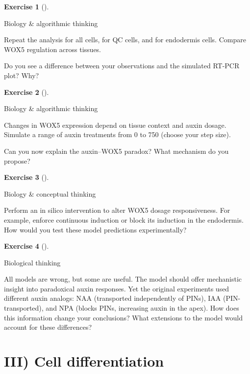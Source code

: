 \documentclass[
  letterpaper,
  DIV=11,
  numbers=noendperiod]{scrreprt}
\theoremstyle{definition}
\newtheorem{exercise}{Exercise}[chapter]
\theoremstyle{remark}
\begin{document}
\begin{exercise}[]\protect\hypertarget{exr-tur}{}\label{exr-tur}

Biology \& algorithmic thinking

Repeat the analysis for all cells, for QC cells, and for endodermis
cells. Compare WOX5 regulation across tissues.

Do you see a difference between your observations and the simulated
RT-PCR plot? Why?

\end{exercise}

\begin{exercise}[]\protect\hypertarget{exr-tur}{}\label{exr-tur}

Biology \& algorithmic thinking

Changes in WOX5 expression depend on tissue context and auxin dosage.
Simulate a range of auxin treatments from 0 to 750 (choose your step
size).

Can you now explain the auxin--WOX5 paradox? What mechanism do you
propose?

\end{exercise}

\begin{exercise}[]\protect\hypertarget{exr-tur}{}\label{exr-tur}

Biology \& conceptual thinking

Perform an in silico intervention to alter WOX5 dosage responsiveness.
For example, enforce continuous induction or block its induction in the
endodermis. How would you test these model predictions experimentally?

\end{exercise}

\begin{exercise}[]\protect\hypertarget{exr-tur}{}\label{exr-tur}

Biological thinking

All models are wrong, but some are useful. The model should offer
mechanistic insight into paradoxical auxin responses. Yet the original
experiments used different auxin analogs: NAA (transported independently
of PINs), IAA (PIN-transported), and NPA (blocks PINs, increasing auxin
in the apex). How does this information change your conclusions? What
extensions to the model would account for these differences?

\end{exercise}

\part{III) Cell differentiation}
\end{document}
